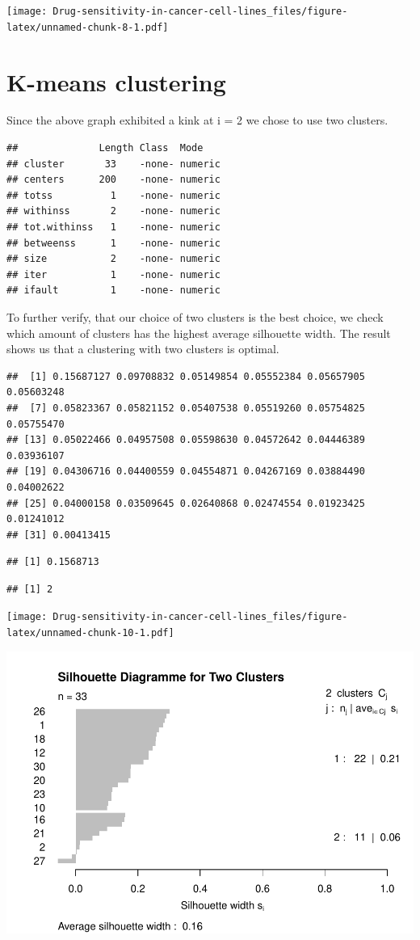 \documentclass[
]{article}
\begin{document}
\texttt{[image: Drug-sensitivity-in-cancer-cell-lines\_files/figure-latex/unnamed-chunk-8-1.pdf]}

\hypertarget{k-means-clustering}{%
\section{K-means clustering}\label{k-means-clustering}}

Since the above graph exhibited a kink at i = 2 we chose to use two
clusters.

\begin{verbatim}
##              Length Class  Mode   
## cluster       33    -none- numeric
## centers      200    -none- numeric
## totss          1    -none- numeric
## withinss       2    -none- numeric
## tot.withinss   1    -none- numeric
## betweenss      1    -none- numeric
## size           2    -none- numeric
## iter           1    -none- numeric
## ifault         1    -none- numeric
\end{verbatim}

To further verify, that our choice of two clusters is the best choice,
we check which amount of clusters has the highest average silhouette
width. The result shows us that a clustering with two clusters is
optimal.

\begin{verbatim}
##  [1] 0.15687127 0.09708832 0.05149854 0.05552384 0.05657905 0.05603248
##  [7] 0.05823367 0.05821152 0.05407538 0.05519260 0.05754825 0.05755470
## [13] 0.05022466 0.04957508 0.05598630 0.04572642 0.04446389 0.03936107
## [19] 0.04306716 0.04400559 0.04554871 0.04267169 0.03884490 0.04002622
## [25] 0.04000158 0.03509645 0.02640868 0.02474554 0.01923425 0.01241012
## [31] 0.00413415
\end{verbatim}

\begin{verbatim}
## [1] 0.1568713
\end{verbatim}

\begin{verbatim}
## [1] 2
\end{verbatim}

\texttt{[image: Drug-sensitivity-in-cancer-cell-lines\_files/figure-latex/unnamed-chunk-10-1.pdf]}

\includegraphics{Drug-sensitivity-in-cancer-cell-lines_files/figure-latex/unnamed-chunk-11-1.pdf}
\end{document}
